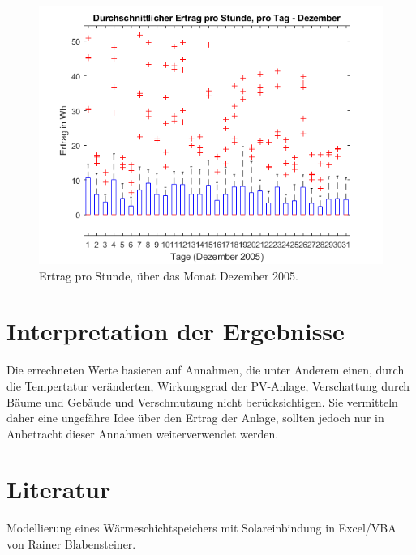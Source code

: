 \documentclass[a4paper,12pt]{article}
\begin{document}
	\begin{figure}[H]
		\centering
		\includegraphics[width=12cm]{img/results/ErtragProStunde_Dezember}
		\caption{Ertrag pro Stunde, über das Monat Dezember 2005.}
	\end{figure}
	\section{Interpretation der Ergebnisse}
	Die errechneten Werte basieren auf Annahmen, die unter Anderem einen, durch die Tempertatur veränderten, Wirkungsgrad der PV-Anlage, Verschattung durch Bäume und Gebäude und Verschmutzung nicht berücksichtigen. Sie vermitteln daher eine ungefähre Idee über den Ertrag der Anlage, sollten jedoch nur in Anbetracht dieser Annahmen weiterverwendet werden.
	\section{Literatur}
	Modellierung eines Wärmeschichtspeichers mit
	Solareinbindung in Excel/VBA von Rainer Blabensteiner.
\end{document}
